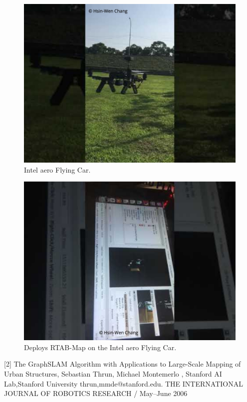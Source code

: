 \documentclass[10pt,journal,compsoc]{IEEEtran}
\begin{document}
\begin{figure}[thpb]
      \centering
      \includegraphics[width=\linewidth]{aero.jpeg}
      \caption{Intel aero Flying Car.}
      \label{fig:robot1}
\end{figure}
\begin{figure}[thpb]
      \centering
      \includegraphics[width=\linewidth]{RTAB-Map.jpeg}
      \caption{Deploys RTAB-Map on the Intel aero Flying Car.}
      \label{fig:robot1}
\end{figure}



[2] The GraphSLAM Algorithm with Applications to Large-Scale Mapping of Urban Structures, Sebastian Thrun, Michael Montemerlo
, Stanford AI Lab,Stanford University {thrun,mmde}@stanford.edu. THE INTERNATIONAL JOURNAL OF ROBOTICS RESEARCH / May–June 2006
\end{document}
